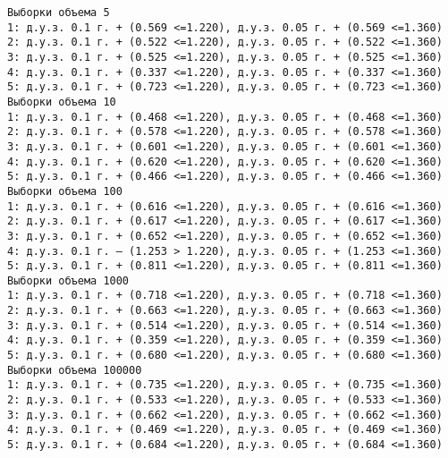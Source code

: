 \documentclass[11pt]{article}
\begin{document}
{\fontsize{11.5}{11}
    \begin{Verbatim}[commandchars=\\\{\}]
Выборки объема 5
1: д.у.з. 0.1 г. + (0.569 <=1.220), д.у.з. 0.05 г. + (0.569 <=1.360)
2: д.у.з. 0.1 г. + (0.522 <=1.220), д.у.з. 0.05 г. + (0.522 <=1.360)
3: д.у.з. 0.1 г. + (0.525 <=1.220), д.у.з. 0.05 г. + (0.525 <=1.360)
4: д.у.з. 0.1 г. + (0.337 <=1.220), д.у.з. 0.05 г. + (0.337 <=1.360)
5: д.у.з. 0.1 г. + (0.723 <=1.220), д.у.з. 0.05 г. + (0.723 <=1.360)
Выборки объема 10
1: д.у.з. 0.1 г. + (0.468 <=1.220), д.у.з. 0.05 г. + (0.468 <=1.360)
2: д.у.з. 0.1 г. + (0.578 <=1.220), д.у.з. 0.05 г. + (0.578 <=1.360)
3: д.у.з. 0.1 г. + (0.601 <=1.220), д.у.з. 0.05 г. + (0.601 <=1.360)
4: д.у.з. 0.1 г. + (0.620 <=1.220), д.у.з. 0.05 г. + (0.620 <=1.360)
5: д.у.з. 0.1 г. + (0.466 <=1.220), д.у.з. 0.05 г. + (0.466 <=1.360)
Выборки объема 100
1: д.у.з. 0.1 г. + (0.616 <=1.220), д.у.з. 0.05 г. + (0.616 <=1.360)
2: д.у.з. 0.1 г. + (0.617 <=1.220), д.у.з. 0.05 г. + (0.617 <=1.360)
3: д.у.з. 0.1 г. + (0.652 <=1.220), д.у.з. 0.05 г. + (0.652 <=1.360)
4: д.у.з. 0.1 г. – (1.253 > 1.220), д.у.з. 0.05 г. + (1.253 <=1.360)
5: д.у.з. 0.1 г. + (0.811 <=1.220), д.у.з. 0.05 г. + (0.811 <=1.360)
Выборки объема 1000
1: д.у.з. 0.1 г. + (0.718 <=1.220), д.у.з. 0.05 г. + (0.718 <=1.360)
2: д.у.з. 0.1 г. + (0.663 <=1.220), д.у.з. 0.05 г. + (0.663 <=1.360)
3: д.у.з. 0.1 г. + (0.514 <=1.220), д.у.з. 0.05 г. + (0.514 <=1.360)
4: д.у.з. 0.1 г. + (0.359 <=1.220), д.у.з. 0.05 г. + (0.359 <=1.360)
5: д.у.з. 0.1 г. + (0.680 <=1.220), д.у.з. 0.05 г. + (0.680 <=1.360)
Выборки объема 100000
1: д.у.з. 0.1 г. + (0.735 <=1.220), д.у.з. 0.05 г. + (0.735 <=1.360)
2: д.у.з. 0.1 г. + (0.533 <=1.220), д.у.з. 0.05 г. + (0.533 <=1.360)
3: д.у.з. 0.1 г. + (0.662 <=1.220), д.у.з. 0.05 г. + (0.662 <=1.360)
4: д.у.з. 0.1 г. + (0.469 <=1.220), д.у.з. 0.05 г. + (0.469 <=1.360)
5: д.у.з. 0.1 г. + (0.684 <=1.220), д.у.з. 0.05 г. + (0.684 <=1.360)
\end{Verbatim}
}
\end{document}
